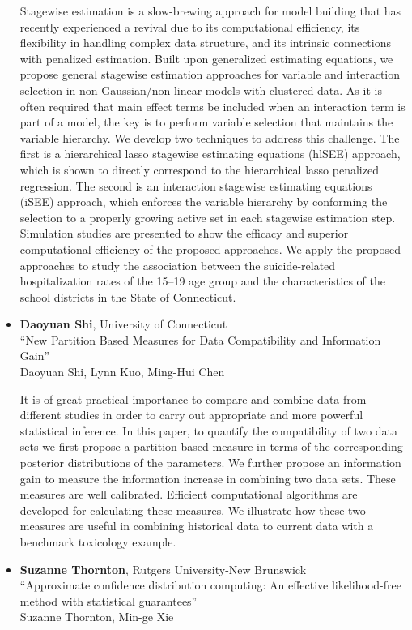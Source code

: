\begin{itemize}
Stagewise estimation is a slow-brewing approach for 
model building that has recently experienced a revival
due to its computational efficiency, its flexibility in 
handling complex data structure, and its intrinsic connections 
with penalized estimation. Built upon generalized estimating 
equations, we propose
general stagewise estimation approaches for variable and 
interaction selection in non-Gaussian/non-linear models with 
clustered data. As it is often required
that main effect terms be included when an interaction term is part of 
a model, the key is to perform variable selection that maintains
the variable hierarchy. We develop two techniques
to address this challenge. The first is a hierarchical
lasso stagewise estimating equations (hlSEE) approach,
which is shown to directly correspond to the hierarchical lasso
penalized regression. The second is an interaction stagewise
estimating equations (iSEE) approach, which enforces the variable 
hierarchy by conforming the selection to a properly growing active 
set in each stagewise estimation step. Simulation studies are presented
to show the efficacy and superior computational efficiency of the 
proposed approaches. We apply the proposed approaches to study the 
association between the suicide-related hospitalization rates of the
15--19 age group and the characteristics of the school districts in 
the State of Connecticut.

\item \textbf{Daoyuan Shi}, University of Connecticut \\
``New Partition Based Measures for Data Compatibility and Information Gain'' \\
Daoyuan Shi, Lynn Kuo, Ming-Hui Chen


It is of great practical importance to compare and combine data from different studies in order to carry out appropriate and more powerful statistical inference. In this paper, to quantify the compatibility of two data sets we first propose a partition based measure in terms of the corresponding posterior distributions of the parameters. We further propose an information gain to measure the information increase in combining two data sets. These measures are well calibrated. Efficient computational algorithms are developed for calculating these measures. We illustrate how these two measures are useful in combining historical data to current data with a benchmark toxicology example.

\item \textbf{Suzanne Thornton}, Rutgers University-New Brunswick \\
``Approximate confidence distribution computing: An effective likelihood-free method with statistical guarantees'' \\
Suzanne Thornton, Min-ge Xie



\end{itemize}
